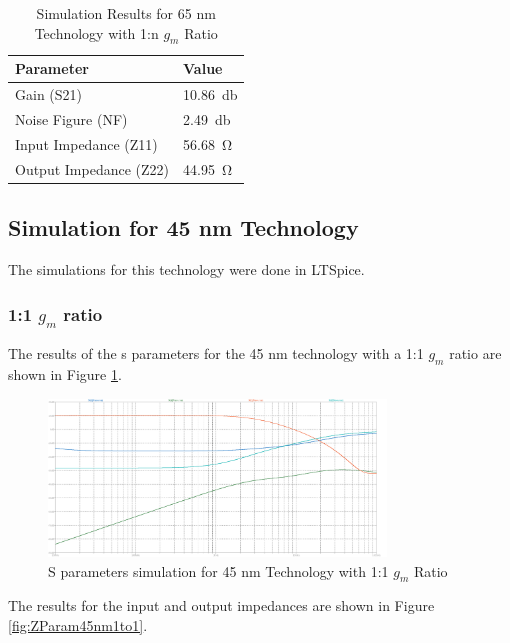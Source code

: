 \begin{table}[H]
    \centering
    \caption{Simulation Results for 65 nm Technology with 1:n $g_m$ Ratio}
    \begin{tabularx}{\textwidth}{>{\centering\arraybackslash}X >{\centering\arraybackslash}X }
        \toprule
        \textbf{Parameter} & \textbf{Value}\\
        \midrule
        Gain (S21) & \SI{10.86}{\decibel} \\
        \midrule
        Noise Figure (NF) & \SI{2.49}{\decibel} \\
        \midrule
        Input Impedance (Z11) & \SI{56.68}{\ohm} \\
        \midrule
        Output Impedance (Z22) & \SI{44.95}{\ohm} \\
        \bottomrule
    \end{tabularx}
    \label{tab:65nm_1ton_results}
\end{table}



\subsection{Simulation for 45 nm Technology}

The simulations for this technology were done in LTSpice.
\subsubsection{1:1 $g_m$ ratio}

The results of the s parameters for the 45 nm technology with a 1:1 $g_m$ ratio are shown in Figure \ref{fig:SParam45nm1to1}. 
\begin{figure}[H]
    \centering
    \includegraphics[width=0.8\textwidth]{Images/SParam_45_1To1.png}
    \caption{S parameters simulation for 45 nm Technology with 1:1 $g_m$ Ratio}
    \label{fig:SParam45nm1to1}
\end{figure}

The results for the input and output impedances are shown in Figure \ref{fig:ZParam45nm1to1}.

